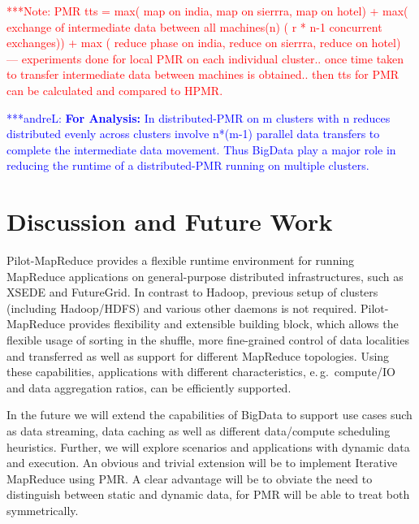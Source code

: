 \documentclass{acm_proc_article-sp}
\newcommand{\alnote}[1]{ {\textcolor{blue} { ***andreL: #1 }}}
\newcommand{\note}[1]{ {\textcolor{red} { ***Note: #1 }}}
\newcommand{\alnote}[1]{}
\newcommand{\note}[1]{}
\newcommand{\pilotmapreduce}{Pilot-MapReduce\xspace}
\begin{document}
\note{
PMR tts = max( map  on india, map on  sierrra, map on hotel) + max( exchange of 
intermediate data between all machines(n) ( r * n-1 concurrent exchanges)) + max 
( reduce phase on  india, reduce on  sierrra, reduce on hotel)
--- experiments done for local PMR on each individual cluster.. once time 
taken to transfer intermediate data between machines is obtained.. then tts 
for PMR can be calculated and compared to HPMR.
}

\alnote{\textbf{For Analysis:}
In distributed-PMR on m clusters
with n reduces distributed evenly across clusters involve n*(m-1) parallel data
transfers to complete the intermediate data movement. Thus BigData play a major
role in reducing the runtime of a distributed-PMR running on multiple clusters.
}

\section{Discussion and Future Work}
\label{sec-conclusion}

\pilotmapreduce provides a flexible runtime environment for running
MapReduce applications on general-purpose distributed infrastructures,
such as XSEDE and FutureGrid. In contrast to Hadoop, previous setup of
clusters (including Hadoop/HDFS) and various other daemons is not
required. Pilot-MapReduce provides flexibility and extensible building
block, which allows the flexible usage of sorting in the shuffle, more
fine-grained control of data localities and transferred as well as
support for different MapReduce topologies. Using these capabilities,
applications with different characteristics, e.\,g.\ compute/IO and
data aggregation ratios, can be efficiently supported.


In the future we will extend the capabilities of BigData to support
use cases such as data streaming, data caching as well as different
data/compute scheduling heuristics. Further, we will explore scenarios
and applications with dynamic data and execution.  An obvious and
trivial extension will be to implement Iterative MapReduce using PMR.
A clear advantage will be to obviate the need to distinguish between
static and dynamic data, for PMR will be able to treat both
symmetrically.



%
%
%
\end{document}
